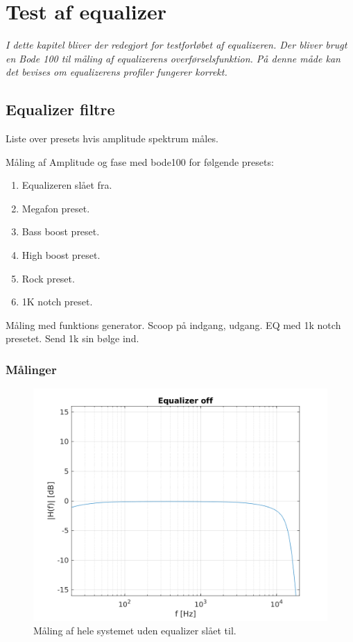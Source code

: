 \chapter{Test af equalizer}\label{sec:test_eq}



\emph{I dette kapitel bliver der redegjort for testforløbet af equalizeren. Der bliver brugt en Bode 100 til måling af equalizerens overførselsfunktion. På denne måde kan det bevises om equalizerens profiler fungerer korrekt.}

\section{Equalizer filtre}


Liste over presets hvis amplitude spektrum måles.

Måling af Amplitude og fase med bode100 for følgende presets:
\begin{enumerate}
    \item Equalizeren slået fra.
    \item Megafon preset.
    \item Bass boost preset.
    \item High boost preset.
    \item Rock preset. 
    \item 1K notch preset.
\end{enumerate}

Måling med funktions generator. Scoop på indgang, udgang.
EQ med 1k notch presetet. 
Send 1k sin bølge ind. 


\subsection{Målinger}


\begin{figure}[h]
\centering
\includegraphics[]{matlabdemo/test/eq_off.png}  
\caption{Måling af hele systemet uden equalizer slået til.}
\end{figure}


